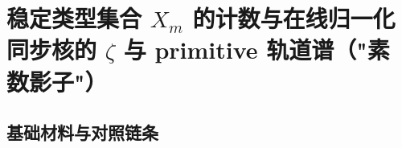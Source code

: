 \section{稳定类型集合 \texorpdfstring{$X_m$}{X\_m} 的计数与在线归一化同步核的 \texorpdfstring{$\zeta$}{zeta} 与 primitive 轨道谱（"素数影子"）}

\subsection{基础材料与对照链条}









